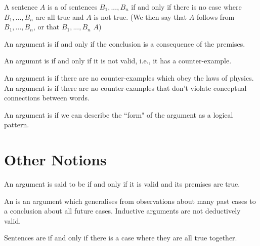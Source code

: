 \begin{definition}[Consequence]{}
    A sentence $A$ is a  of sentences $B_1,...,B_n$ if and only if there is no case where $B_1,...,B_n$ are all true and $A$ is not true. (We then say that $A$ follows from $B_1,...,B_n$, or that $B_1,...,B_n$  $A$)
\end{definition}


\begin{definition}{}
    An argument is  if and only if the conclusion is a consequence of the premises.
\end{definition}

\begin{definition}{}
    An argumnt is  if and only if it is not valid, i.e., it has a counter-example.
\end{definition}


\begin{remark}
    An argument is  if there are no counter-examples which obey the laws of physics. An argument is  if there are no counter-examples that don't violate conceptual connections between words.
\end{remark}


\begin{remark}
    An argument is  if we can describe the ``form" of the argument as a logical pattern.
\end{remark}

\section{ Other Notions}

\begin{definition}
    An argument is said to be  if and only if it is valid and its premises are true.
\end{definition}


\begin{definition}
    An  is an argument which generalises from observations about many past cases to a conclusion about all future cases. Inductive arguments are not deductively valid.
\end{definition}

\begin{definition}{}
    Sentences are  if and only if there is a case where they are all true together.
\end{definition}

